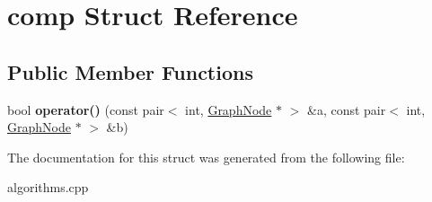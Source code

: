 \hypertarget{structcomp}{\section{comp \-Struct \-Reference}
\label{structcomp}
}
\subsection*{\-Public \-Member \-Functions}
\begin{DoxyCompactItemize}
\item 
\hypertarget{structcomp_a107e46fa5c002597395c16c112bab3b5}{bool {\bfseries operator()} (const pair$<$ int, \hyperlink{structGraphNode}{\-Graph\-Node} $\ast$ $>$ \&a, const pair$<$ int, \hyperlink{structGraphNode}{\-Graph\-Node} $\ast$ $>$ \&b)}\label{structcomp_a107e46fa5c002597395c16c112bab3b5}

\end{DoxyCompactItemize}


\-The documentation for this struct was generated from the following file\-:\begin{DoxyCompactItemize}
\item 
algorithms.\-cpp\end{DoxyCompactItemize}

